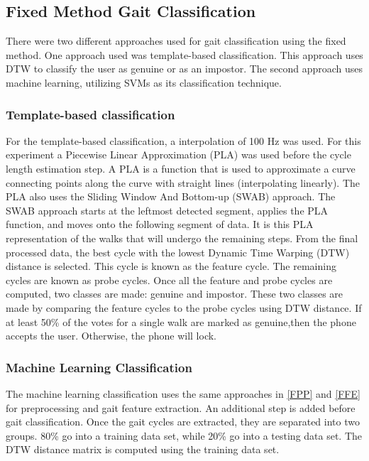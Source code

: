 \documentclass{sig-alternate}
\begin{document}
\subsection{Fixed Method Gait Classification}
There were two different approaches used for gait classification using the fixed method. One approach used was template-based classification. This approach uses DTW to classify the user as genuine or as an impostor. The second approach uses machine learning, utilizing SVMs as its classification technique. 
\subsubsection{Template-based classification}
	 For the template-based classification, a interpolation of 100 Hz was used. For this experiment a Piecewise Linear Approximation (PLA) was used before the cycle length estimation step. A PLA is a function that is used to approximate a curve connecting points along the curve with straight lines (interpolating linearly). The PLA also uses the Sliding Window And Bottom-up (SWAB) approach. The SWAB approach starts at the leftmost detected segment, applies the PLA function, and moves onto the following segment of data. It is this PLA representation of the walks that will undergo the remaining steps. From the final processed data, the best cycle with the lowest Dynamic Time Warping (DTW) distance is selected. This cycle is known as the feature cycle. The remaining cycles are known as probe cycles. Once all the feature and probe cycles are computed, two classes are made: genuine and impostor. These two classes are made by comparing the feature cycles to the probe cycles using DTW distance. If at least 50\% of the votes for a single walk are marked as genuine,then the phone accepts the user. Otherwise, the phone will lock.


\subsubsection{Machine Learning Classification}
	The machine learning classification uses the same approaches in \ref{FPP} and \ref{FFE} for preprocessing and gait feature extraction. An additional step is added before gait classification. Once the gait cycles are extracted, they are separated into two groups. 80\% go into a training data set, while 20\% go into a testing data set. The DTW distance matrix is computed using the training data set.
\end{document}
